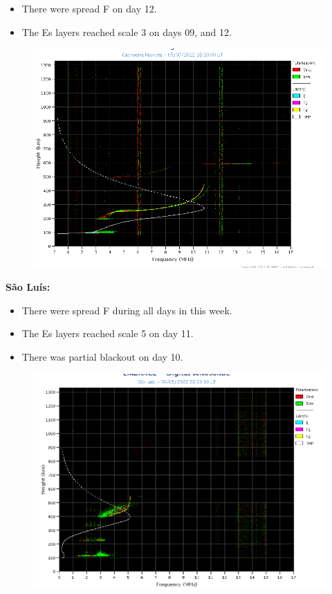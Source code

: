 \documentclass[a4paper, 10pt]{article}
\begin{document}
 \begin{itemize}
\item There were spread F on day 12.
\item The Es layers reached scale 3 on days 09, and 12. 
\end{itemize}
\begin{figure}[H]
    \centering
    \includegraphics[width=14cm]{./figures//CachoeiraPaulista.png}
\end{figure}

\textbf{São Luís: }

 \begin{itemize}
\item There were spread F during all days in this week.
\item The Es layers reached scale 5 on day 11. 
\item There was partial blackout on day 10. 
\end{itemize}
\begin{figure}[H]
    \centering
    \includegraphics[width=14cm]{./figures//SãoLuís.png}
\end{figure}
\end{document}
